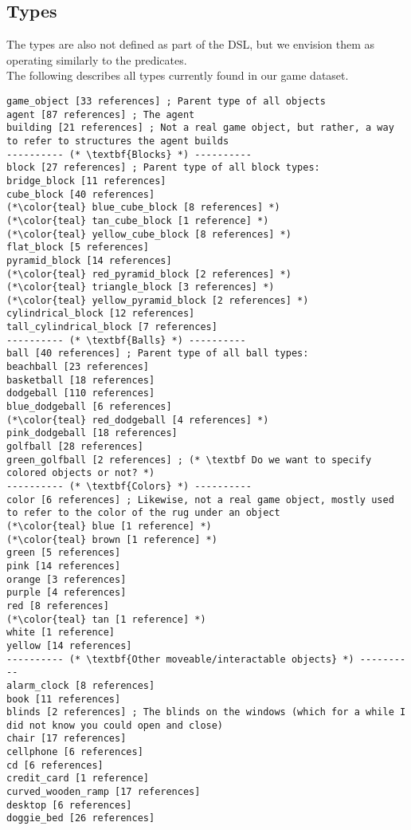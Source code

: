 \documentclass{article}
\begin{document}
\subsection{Types}
The types are also not defined as part of the DSL, but we envision them as operating similarly to the predicates. \\
            
            The following describes all types currently found in our game dataset. 
        
\begin{lstlisting}
game_object [33 references] ; Parent type of all objects
agent [87 references] ; The agent
building [21 references] ; Not a real game object, but rather, a way to refer to structures the agent builds
---------- (* \textbf{Blocks} *) ----------
block [27 references] ; Parent type of all block types:
bridge_block [11 references] 
cube_block [40 references] 
(*\color{teal} blue_cube_block [8 references] *)
(*\color{teal} tan_cube_block [1 reference] *)
(*\color{teal} yellow_cube_block [8 references] *)
flat_block [5 references] 
pyramid_block [14 references] 
(*\color{teal} red_pyramid_block [2 references] *)
(*\color{teal} triangle_block [3 references] *)
(*\color{teal} yellow_pyramid_block [2 references] *)
cylindrical_block [12 references] 
tall_cylindrical_block [7 references] 
---------- (* \textbf{Balls} *) ----------
ball [40 references] ; Parent type of all ball types:
beachball [23 references] 
basketball [18 references] 
dodgeball [110 references] 
blue_dodgeball [6 references] 
(*\color{teal} red_dodgeball [4 references] *)
pink_dodgeball [18 references] 
golfball [28 references] 
green_golfball [2 references] ; (* \textbf Do we want to specify colored objects or not? *)
---------- (* \textbf{Colors} *) ----------
color [6 references] ; Likewise, not a real game object, mostly used to refer to the color of the rug under an object
(*\color{teal} blue [1 reference] *)
(*\color{teal} brown [1 reference] *)
green [5 references] 
pink [14 references] 
orange [3 references] 
purple [4 references] 
red [8 references] 
(*\color{teal} tan [1 reference] *)
white [1 reference] 
yellow [14 references] 
---------- (* \textbf{Other moveable/interactable objects} *) ----------
alarm_clock [8 references] 
book [11 references] 
blinds [2 references] ; The blinds on the windows (which for a while I did not know you could open and close)
chair [17 references] 
cellphone [6 references] 
cd [6 references] 
credit_card [1 reference] 
curved_wooden_ramp [17 references] 
desktop [6 references] 
doggie_bed [26 references] 

\end{lstlisting}
\end{document}
